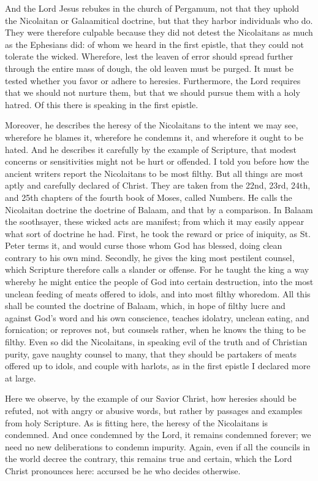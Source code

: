 And the Lord Jesus rebukes in the church of Pergamum, not that they uphold the Nicolaitan or Galaamitical doctrine, but that they harbor individuals who do. They were therefore culpable because they did not detest the Nicolaitans as much as the Ephesians did: of whom we heard in the first epistle, that they could not tolerate the wicked. Wherefore, lest the leaven of error should spread further through the entire mass of dough, the old leaven must be purged. It must be tested whether you favor or adhere to heresies. Furthermore, the Lord requires that we should not nurture them, but that we should pursue them with a holy hatred. Of this there is speaking in the first epistle.

Moreover, he describes the heresy of the Nicolaitans to the intent we may see, wherefore he blames it, wherefore he condemns it, and wherefore it ought to be hated. And he describes it carefully by the example of Scripture, that modest concerns or sensitivities might not be hurt or offended. I told you before how the ancient writers report the Nicolaitans to be most filthy. But all things are most aptly and carefully declared of Christ. They are taken from the 22nd, 23rd, 24th, and 25th chapters of the fourth book of Moses, called Numbers. He calls the Nicolaitan doctrine the doctrine of Balaam, and that by a comparison. In Balaam the soothsayer, these wicked acts are manifest; from which it may easily appear what sort of doctrine he had. First, he took the reward or price of iniquity, as St. Peter terms it, and would curse those whom God has blessed, doing clean contrary to his own mind. Secondly, he gives the king most pestilent counsel, which Scripture therefore calls a slander or offense. For he taught the king a way whereby he might entice the people of God into certain destruction, into the most unclean feeding of meats offered to idols, and into most filthy whoredom. All this shall be counted the doctrine of Balaam, which, in hope of filthy lucre and against God’s word and his own conscience, teaches idolatry, unclean eating, and fornication; or reproves not, but counsels rather, when he knows the thing to be filthy. Even so did the Nicolaitans, in speaking evil of the truth and of Christian purity, gave naughty counsel to many, that they should be partakers of meats offered up to idols, and couple with harlots, as in the first epistle I declared more at large.

Here we observe, by the example of our Savior Christ, how heresies should be refuted, not with angry or abusive words, but rather by passages and examples from holy Scripture. As is fitting here, the heresy of the Nicolaitans is condemned. And once condemned by the Lord, it remains condemned forever; we need no new deliberations to condemn impurity. Again, even if all the councils in the world decree the contrary, this remains true and certain, which the Lord Christ pronounces here: accursed be he who decides otherwise.

